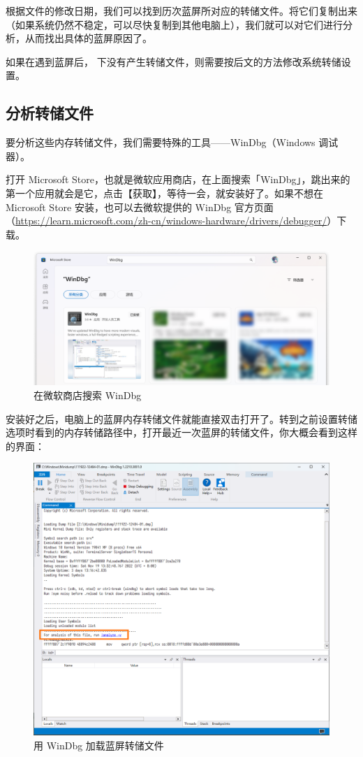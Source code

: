 根据文件的修改日期，我们可以找到历次蓝屏所对应的转储文件。将它们复制出来（如果系统仍然不稳定，可以尽快复制到其他电脑上），我们就可以对它们进行分析，从而找出具体的蓝屏原因了。

\begin{note}
  如果在遇到蓝屏后， 下没有产生转储文件，则需要按后文的方法修改系统转储设置。
\end{note}

\subsection{分析转储文件}

要分析这些内存转储文件，我们需要特殊的工具——WinDbg（Windows 调试器）。

打开 Microsoft Store，也就是微软应用商店，在上面搜索「WinDbg」，跳出来的第一个应用就会是它，点击【获取】，等待一会，就安装好了。如果不想在 Microsoft Store 安装，也可以去微软提供的 WinDbg 官方页面（\url{https://learn.microsoft.com/zh-cn/windows-hardware/drivers/debugger/}）下载。

\begin{figure}[htb!]
  \centering
  \includegraphics[width=.8\textwidth]{assets/advanced/WinDbg.png}
  \caption{在微软商店搜索 WinDbg}
  \label{fig:WinDbg}
\end{figure}

安装好之后，电脑上的蓝屏内存转储文件就能直接双击打开了。转到之前设置转储选项时看到的内存转储路径中，打开最近一次蓝屏的转储文件，你大概会看到这样的界面：

\begin{figure}[htb!]
  \centering
  \includegraphics[width=.8\textwidth]{assets/advanced/WinDbg-1.png}
  \caption{用 WinDbg 加载蓝屏转储文件}
  \label{fig:WinDbg-1}
\end{figure}

